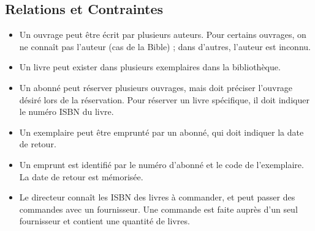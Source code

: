 \documentclass[a4paper,11pt]{article}
\begin{document}
\subsection{Relations et Contraintes}
\begin{itemize}
    \item Un ouvrage peut être écrit par plusieurs auteurs. Pour certains ouvrages, on ne connaît pas l'auteur (cas de la Bible) ; dans d'autres, l’auteur est inconnu.
    \item Un livre peut exister dans plusieurs exemplaires dans la bibliothèque.
    \item Un abonné peut réserver plusieurs ouvrages, mais doit préciser l'ouvrage désiré lors de la réservation. Pour réserver un livre spécifique, il doit indiquer le numéro ISBN du livre.
    \item Un exemplaire peut être emprunté par un abonné, qui doit indiquer la date de retour.
    \item Un emprunt est identifié par le numéro d'abonné et le code de l'exemplaire. La date de retour est mémorisée.
    \item Le directeur connaît les ISBN des livres à commander, et peut passer des commandes avec un fournisseur. Une commande est faite auprès d’un seul fournisseur et contient une quantité de livres.
\end{itemize}
\end{document}
